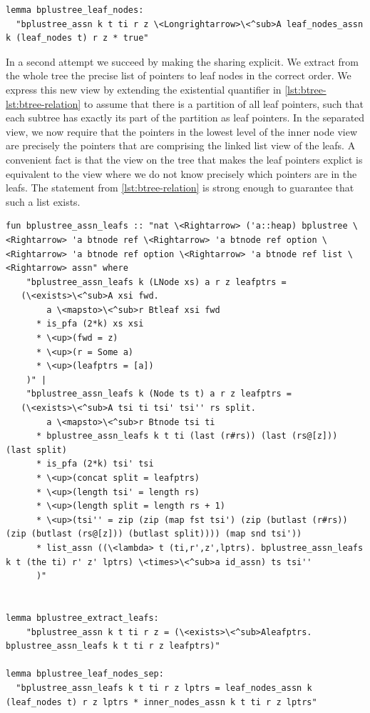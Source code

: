 \documentclass[a4paper,UKenglish,cleveref, autoref, thm-restate]{lipics-v2021}
\begin{document}
\begin{lstlisting}[mathescape=true, language=Isabelle,label=lst:btree-view-split-oneway]
lemma bplustree_leaf_nodes:
  "bplustree_assn k t ti r z \<Longrightarrow>\<^sub>A leaf_nodes_assn k (leaf_nodes t) r z * true"
\end{lstlisting}


In a second attempt we succeed by making the sharing explicit.
We extract from the whole tree the precise list of pointers to leaf nodes
in the correct order.
We express this new view by extending the existential quantifier in \autoref{lst:btree-lst:btree-relation}
to assume that there is a partition of all leaf pointers,
such that each subtree has exactly its part of the partition as leaf pointers.
In the separated view, we now require that the pointers
in the lowest level of the inner node view are precisely the pointers
that are comprising the linked list view of the leafs.
A convenient fact is that the view on the tree that makes the leaf pointers explict
is equivalent to the view where we do not know precisely which pointers are in the leafs.
The statement from \autoref{lst:btree-relation} is strong enough to guarantee that such a list exists.


\begin{lstlisting}[mathescape=true, language=Isabelle,label=lst:btree-view-split]
fun bplustree_assn_leafs :: "nat \<Rightarrow> ('a::heap) bplustree \<Rightarrow> 'a btnode ref \<Rightarrow> 'a btnode ref option \<Rightarrow> 'a btnode ref option \<Rightarrow> 'a btnode ref list \<Rightarrow> assn" where
    "bplustree_assn_leafs k (LNode xs) a r z leafptrs =
   (\<exists>\<^sub>A xsi fwd.
        a \<mapsto>\<^sub>r Btleaf xsi fwd
      * is_pfa (2*k) xs xsi
      * \<up>(fwd = z)
      * \<up>(r = Some a)
      * \<up>(leafptrs = [a])
    )" |
    "bplustree_assn_leafs k (Node ts t) a r z leafptrs =
   (\<exists>\<^sub>A tsi ti tsi' tsi'' rs split.
        a \<mapsto>\<^sub>r Btnode tsi ti
      * bplustree_assn_leafs k t ti (last (r#rs)) (last (rs@[z])) (last split)
      * is_pfa (2*k) tsi' tsi
      * \<up>(concat split = leafptrs)
      * \<up>(length tsi' = length rs)
      * \<up>(length split = length rs + 1)
      * \<up>(tsi'' = zip (zip (map fst tsi') (zip (butlast (r#rs)) (zip (butlast (rs@[z])) (butlast split)))) (map snd tsi'))
      * list_assn ((\<lambda> t (ti,r',z',lptrs). bplustree_assn_leafs k t (the ti) r' z' lptrs) \<times>\<^sub>a id_assn) ts tsi''
      )"


lemma bplustree_extract_leafs:
    "bplustree_assn k t ti r z = (\<exists>\<^sub>Aleafptrs. bplustree_assn_leafs k t ti r z leafptrs)"

lemma bplustree_leaf_nodes_sep:
  "bplustree_assn_leafs k t ti r z lptrs = leaf_nodes_assn k (leaf_nodes t) r z lptrs * inner_nodes_assn k t ti r z lptrs"
\end{lstlisting}
\end{document}

